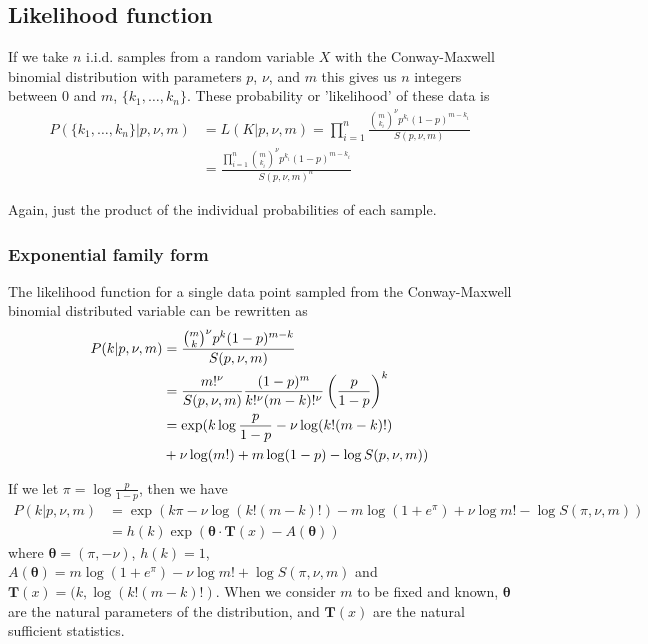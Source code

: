 \documentclass[a4paper,12pt]{article}
\theoremstyle{definition}
\begin{document}
\subsection{Likelihood function}
If we take $n$ i.i.d. samples from a random variable $X$ with the Conway-Maxwell binomial distribution with parameters $p$, $\nu$, and $m$ this gives us $n$ integers between $0$ and $m$, $\lbrace k_1, \dots , k_n \rbrace$. These probability or 'likelihood' of these data is
\begin{align}
  P(\lbrace k_1, \dots, k_n \rbrace | p, \nu, m) &= L(K | p, \nu, m) = \prod_{i=1}^{n} \frac{\binom{m}{k_i}^{\nu} p^{k_i} (1-p)^{m-k_i}}{S(p, \nu, m)} \\ 
  & = \frac{\prod_{i=1}^{n} \binom{m}{k_i}^{\nu} p^{k_i} (1-p)^{m-k_i}}{S(p, \nu, m)^n}
\end{align}

Again, just the product of the individual probabilities of each sample.

\subsubsection{Exponential family form}
The likelihood function for a single data point sampled from the Conway-Maxwell binomial distributed variable can be rewritten as 
\begin{align}
  P(k | p, \nu, m) & = \frac{\binom{m}{k}^{\nu} p^{k} (1-p)^{m-k}}{S(p, \nu, m)} \\
  & = \frac{m!^{\nu}}{S(p, \nu, m)} \frac{(1-p)^{m}}{k!^{\nu}(m - k)!^{\nu}} \left( \frac{p}{1-p} \right)^{k} \\
  & = \exp \large( k \log \frac{p}{1-p} - \nu \log(k!(m-k)!) \\ 
  & + \nu \log (m!)  + m \log (1 - p) - \log S(p, \nu, m) \large)
\end{align}

If we let $\pi = \log \frac{p}{1-p}$, then we have 
\begin{align}
  P(k | p, \nu, m) & = \exp \left( k \pi - \nu \log(k!(m-k)!) - m \log (1 + e^{\pi}) + \nu \log m!  - \log S(\pi, \nu, m) \right) \\ 
  & = h (k) \exp \left( \boldsymbol{\theta} \cdot \mathbf{T} (x) - A (\boldsymbol{\theta}) \right)
\end{align}
where $\boldsymbol{\theta} = (\pi, -\nu)$, $h(k) = 1$, $A(\boldsymbol{\theta}) = m \log (1 + e^{\pi}) - \nu \log m!  + \log S(\pi, \nu, m)$ and $\mathbf{T} (x) = (k, \log(k!(m-k)!)$.
When we consider $m$ to be fixed and known, $\boldsymbol{\theta}$ are the natural parameters of the distribution, and $\mathbf{T} (x)$ are the natural sufficient statistics.
\end{document}
